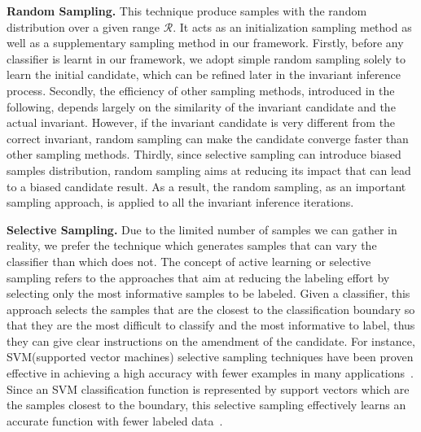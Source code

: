 \medskip\noindent
\textbf{Random Sampling.}
This technique produce samples with the random distribution over a given range $\mathcal{R}$.
It acts as an initialization sampling method 
as well as a supplementary sampling method in our framework. 
Firstly, before any classifier is learnt in our framework, 
we adopt simple random sampling solely to learn the initial candidate, 
which can be refined later in the invariant inference process. 
Secondly, the efficiency of other sampling methods, introduced in the following, 
depends largely on the similarity of the invariant candidate and the actual invariant. 
However, if the invariant candidate is very different from the correct invariant, 
random sampling can make the candidate converge faster than other sampling methods. 
Thirdly, since selective sampling can introduce biased samples distribution, 
random sampling aims at reducing its impact that can lead to a biased candidate result. 
As a result, the random sampling, as an important sampling approach, 
is applied to all the invariant inference iterations. 

\medskip\noindent
\textbf{Selective Sampling.}
Due to the limited number of samples we can gather in reality, 
we prefer the technique which generates samples that can vary the classifier than which does not.
The concept of active learning or selective sampling refers to the approaches 
that aim at reducing the labeling effort by selecting only the most informative samples to be labeled.
Given a classifier, this approach selects the samples that are the closest to the classification boundary 
so that they are the most difficult to classify and the most informative to label,
thus they can give clear instructions on the amendment of the candidate.
For instance, SVM(supported vector machines) selective sampling techniques have been proven effective in achieving a high accuracy 
with fewer examples in many applications~\cite{DBLP:conf/mm/TongC01,DBLP:journals/jmlr/TongK01}. 
Since an SVM classification function is represented by support vectors which are the samples closest to the boundary, 
this selective sampling effectively learns an accurate function with fewer labeled data~\cite{DBLP:conf/icml/SchohnC00}.

